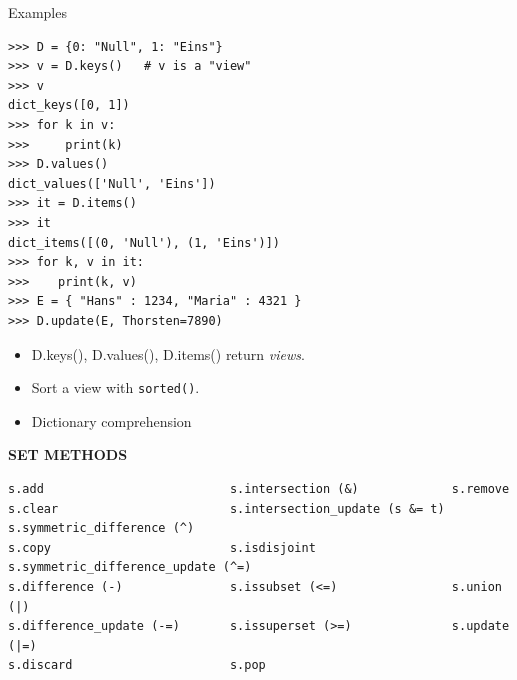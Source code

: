 \documentclass[9pt,a4wide]{extarticle}
\begin{document}
\bigskip

Examples

\begin{verbatim}
>>> D = {0: "Null", 1: "Eins"}
>>> v = D.keys()   # v is a "view"
>>> v
dict_keys([0, 1])
>>> for k in v:
>>>     print(k)
>>> D.values()
dict_values(['Null', 'Eins'])
>>> it = D.items()
>>> it
dict_items([(0, 'Null'), (1, 'Eins')])
>>> for k, v in it:
>>>    print(k, v)
>>> E = { "Hans" : 1234, "Maria" : 4321 }
>>> D.update(E, Thorsten=7890)
\end{verbatim}

\begin{itemize}
\item D.keys(), D.values(), D.items() return {\em views}. 
\item Sort a view with {\tt sorted()}.
\item Dictionary comprehension
\end{itemize}




\bigskip
{\LARGE\bf SET METHODS}

\begin{verbatim}
s.add                          s.intersection (&)             s.remove
s.clear                        s.intersection_update (s &= t) s.symmetric_difference (^)
s.copy                         s.isdisjoint                   s.symmetric_difference_update (^=)
s.difference (-)               s.issubset (<=)                s.union (|)
s.difference_update (-=)       s.issuperset (>=)              s.update (|=)
s.discard                      s.pop                          
\end{verbatim}


\bigskip
\end{document}
